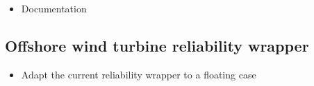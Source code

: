\begin{itemize}
    \item Documentation
\end{itemize}

\subsection*{Offshore wind turbine reliability wrapper}

\begin{itemize}
    \item Adapt the current reliability wrapper to a floating case
\end{itemize}